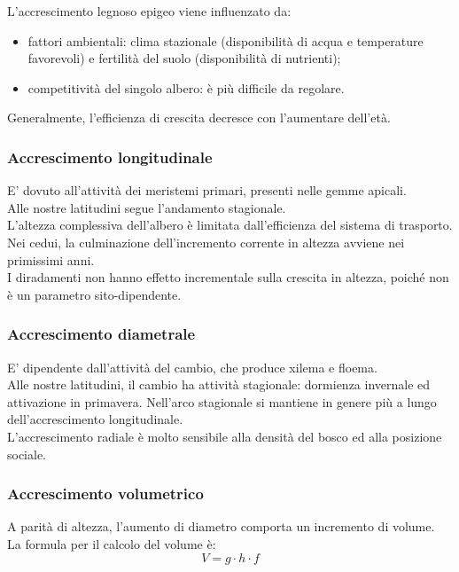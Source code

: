 \documentclass{article}
\begin{document}
L'accrescimento legnoso epigeo viene influenzato da:
\begin{itemize}
    \item fattori ambientali: clima stazionale (disponibilità di acqua e temperature favorevoli) e fertilità del suolo (disponibilità di nutrienti);
    \item competitività del singolo albero: è più difficile da regolare.
\end{itemize}
Generalmente, l'efficienza di crescita decresce con l'aumentare dell'età.
\subsubsection{Accrescimento longitudinale}
E' dovuto all'attività dei meristemi primari, presenti nelle gemme apicali.\\
Alle nostre latitudini segue l'andamento stagionale.\\
L'altezza complessiva dell'albero è limitata dall'efficienza del sistema di trasporto.\\
Nei cedui, la culminazione dell'incremento corrente in altezza avviene nei primissimi anni.\\
I diradamenti non hanno effetto incrementale sulla crescita in altezza, poiché non è un parametro sito-dipendente.
\subsubsection{Accrescimento diametrale}
E' dipendente dall'attività del cambio, che produce xilema e floema.\\
Alle nostre latitudini, il cambio ha attività stagionale: dormienza invernale ed attivazione in primavera. Nell'arco stagionale si mantiene in genere più a lungo dell'accrescimento longitudinale.\\
L'accrescimento radiale è molto sensibile alla densità del bosco ed alla posizione sociale.\\
\subsubsection{Accrescimento volumetrico}
A parità di altezza, l'aumento di diametro comporta un incremento di volume.\\
La formula per il calcolo del volume è:
\begin{equation}
    V = g \cdot h \cdot f
\end{equation}
\end{document}
